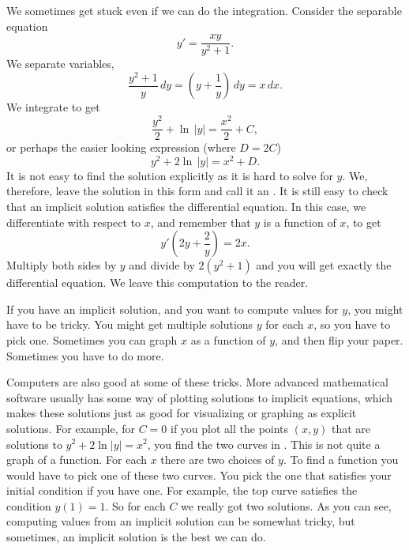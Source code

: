We sometimes get stuck even if we can do the
integration.  Consider the separable equation
\begin{equation*}
y' = \frac{xy}{y^2+1} .
\end{equation*}
We separate variables,
\begin{equation*}
\frac{y^2+1}{y}\,dy = \left(y+\frac{1}{y}\right)\,dy = x\,dx .
\end{equation*}
We integrate to get
\begin{equation*}
\frac{y^2}{2} + \ln \, \lvert y \rvert = \frac{x^2}{2} + C ,
\end{equation*}
or perhaps the easier looking expression (where $D = 2C$)
\begin{equation*}
y^2 + 2 \ln \, \lvert y\rvert = x^2 + D .
\end{equation*}
It is not easy to find the solution explicitly as it is hard to solve
for $y$.  We, therefore, leave the solution in this form and call
it an
\emph{}.
It is still
easy to check that an implicit solution satisfies the differential
equation.  In this case, we differentiate with respect to $x$, and remember
that $y$ is a function of $x$,
to get
\begin{equation*}
y'\left(2y + \frac{2}{y}\right) = 2x .
\end{equation*}
Multiply both sides by $y$ and divide by $2(y^2+1)$ and you will
get exactly the differential equation.  We leave this computation to the
reader.

If you have an implicit solution, and
you want to compute values
for $y$, you might have to be tricky.  You might get multiple solutions $y$
for each $x$, so you have to pick one.  Sometimes you can
graph $x$ as a function of $y$, and then flip your paper.
Sometimes you have to do more.

Computers are also good at some of these tricks.
More advanced mathematical software usually has some
way of plotting solutions to implicit equations, which makes these solutions just as 
good for visualizing or graphing as explicit solutions.
For example, for $C=0$ if you plot all the points $(x,y)$ that
are solutions to $y^2+2\ln|y|=x^2$,
you find the two curves in .  This is not quite
a graph of a function. For each $x$ there are two choices of $y$.
To find a function you would have to pick one of these two curves.
You pick the one that satisfies your initial condition if you have one.
For example, the top curve satisfies the condition $y(1)=1$.
So for each $C$ we really got two solutions.
As you can see, computing values from an implicit solution can be somewhat
tricky, but sometimes, an implicit solution is the best we can do.

